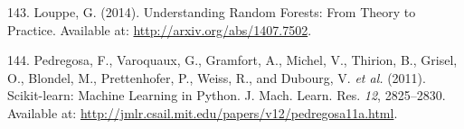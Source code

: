 \documentclass[12pt,a4paper,twoside]{book}
\theoremstyle{definition}
\theoremstyle{definition}
\theoremstyle{remark}
\begin{document}
\hypertarget{ref-Louppe2014}{}
143. Louppe, G. (2014). Understanding Random Forests: From Theory to
Practice. Available at: \url{http://arxiv.org/abs/1407.7502}.

\hypertarget{ref-Pedregosa2011}{}
144. Pedregosa, F., Varoquaux, G., Gramfort, A., Michel, V., Thirion,
B., Grisel, O., Blondel, M., Prettenhofer, P., Weiss, R., and Dubourg,
V. \emph{et al.} (2011). Scikit-learn: Machine Learning in Python. J.
Mach. Learn. Res. \emph{12}, 2825--2830. Available at:
\url{http://jmlr.csail.mit.edu/papers/v12/pedregosa11a.html}.
\end{document}
